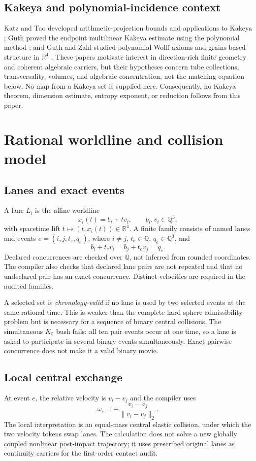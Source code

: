 \documentclass[11pt]{article}
\theoremstyle{definition}
\theoremstyle{remark}
\newcommand{\R}{\mathbb R}
\newcommand{\Q}{\mathbb Q}
\newcommand{\norm}[1]{\lVert#1\rVert}
\begin{document}
\subsection{Kakeya and polynomial-incidence context}
Katz and Tao developed arithmetic-projection bounds and applications to Kakeya \cite{katztao1999,katztao2002}; Guth proved the endpoint multilinear Kakeya estimate using the polynomial method \cite{guth2010}; and Guth and Zahl studied polynomial Wolff axioms and grains-based structure in $\R^4$ \cite{guthzahl2018}. These papers motivate interest in direction-rich finite geometry and coherent algebraic carriers, but their hypotheses concern tube collections, transversality, volumes, and algebraic concentration, not the matching equation below. No map from a Kakeya set is supplied here. Consequently, no Kakeya theorem, dimension estimate, entropy exponent, or reduction follows from this paper.

\section{Rational worldline and collision model}

\subsection{Lanes and exact events}
A lane $L_i$ is the affine worldline
\[
 x_i(t)=b_i+t v_i,\qquad b_i,v_i\in\Q^3,
\]
with spacetime lift $t\mapsto(t,x_i(t))\in\R^4$. A finite family consists of named lanes and events $e=(i,j,t_e,q_e)$, where $i\ne j$, $t_e\in\Q$, $q_e\in\Q^3$, and
\[
 b_i+t_e v_i=b_j+t_e v_j=q_e.
\]
Declared concurrences are checked over $\Q$, not inferred from rounded coordinates. The compiler also checks that declared lane pairs are not repeated and that no undeclared pair has an exact concurrence. Distinct velocities are required in the audited families.

A selected set is \emph{chronology-valid} if no lane is used by two selected events at the same rational time. This is weaker than the complete hard-sphere admissibility problem but is necessary for a sequence of binary central collisions. The simultaneous $K_5$ bush fails: all ten pair events occur at one time, so a lane is asked to participate in several binary events simultaneously. Exact pairwise concurrence does not make it a valid binary movie.

\subsection{Local central exchange}
At event $e$, the relative velocity is $v_i-v_j$ and the compiler uses
\[
 \omega_e=-\frac{v_i-v_j}{\norm{v_i-v_j}_2}.
\]
The local interpretation is an equal-mass central elastic collision, under which the two velocity tokens swap lanes. The calculation does not solve a new globally coupled nonlinear post-impact trajectory; it uses prescribed original lanes as continuity carriers for the first-order contact audit.
\end{document}
